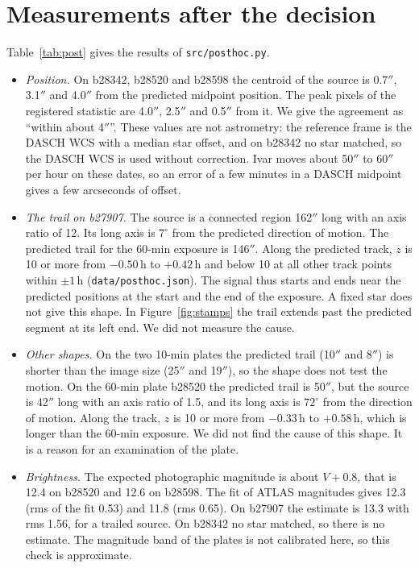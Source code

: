 \documentclass[11pt]{article}
\newcommand{\as}{$''$}
\begin{document}
\section{Measurements after the decision}
Table~\ref{tab:post} gives the results of \texttt{src/posthoc.py}.
\begin{itemize}
\item \emph{Position.} On b28342, b28520 and b28598 the centroid of the source is 0.7\as, 3.1\as{} and 4.0\as{} from the predicted midpoint position. The peak pixels of the registered statistic are 4.0\as, 2.5\as{} and 0.5\as{} from it. We give the agreement as ``within about 4\as''. These values are not astrometry: the reference frame is the DASCH WCS with a median star offset, and on b28342 no star matched, so the DASCH WCS is used without correction. Ivar moves about 50\as{} to 60\as{} per hour on these dates, so an error of a few minutes in a DASCH midpoint gives a few arcseconds of offset.
\item \emph{The trail on b27907.} The source is a connected region 162\as{} long with an axis ratio of 12. Its long axis is $7^\circ$ from the predicted direction of motion. The predicted trail for the 60-min exposure is 146\as. Along the predicted track, $z$ is 10 or more from $-0.50$\,h to $+0.42$\,h and below 10 at all other track points within $\pm1$\,h (\texttt{data/posthoc.json}). The signal thus starts and ends near the predicted positions at the start and the end of the exposure. A fixed star does not give this shape. In Figure~\ref{fig:stamps} the trail extends past the predicted segment at its left end. We did not measure the cause.
\item \emph{Other shapes.} On the two 10-min plates the predicted trail (10\as{} and 8\as) is shorter than the image size (25\as{} and 19\as), so the shape does not test the motion. On the 60-min plate b28520 the predicted trail is 50\as, but the source is 42\as{} long with an axis ratio of 1.5, and its long axis is $72^\circ$ from the direction of motion. Along the track, $z$ is 10 or more from $-0.33$\,h to $+0.58$\,h, which is longer than the 60-min exposure. We did not find the cause of this shape. It is a reason for an examination of the plate.
\item \emph{Brightness.} The expected photographic magnitude is about $V+0.8$, that is 12.4 on b28520 and 12.6 on b28598. The fit of ATLAS magnitudes gives 12.3 (rms of the fit 0.53) and 11.8 (rms 0.65). On b27907 the estimate is 13.3 with rms 1.56, for a trailed source. On b28342 no star matched, so there is no estimate. The magnitude band of the plates is not calibrated here, so this check is approximate.
\end{itemize}
\end{document}
